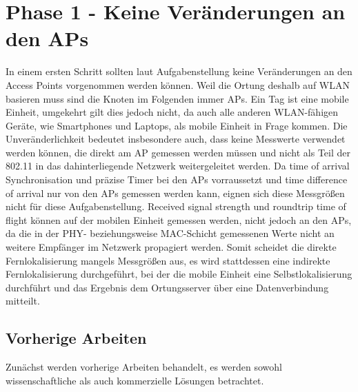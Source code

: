 \chapter{Phase 1 - Keine Veränderungen an den APs}
\label{ch:phase1}
In einem ersten Schritt sollten laut Aufgabenstellung keine Veränderungen an den Access Points vorgenommen werden können.
Weil die Ortung deshalb auf WLAN basieren muss sind die Knoten im Folgenden immer APs. 
Ein Tag ist eine mobile Einheit, umgekehrt gilt dies jedoch nicht, da auch alle anderen WLAN-fähigen Geräte, wie Smartphones und Laptops, als mobile Einheit in Frage kommen.
Die Unveränderlichkeit bedeutet insbesondere auch, dass keine Messwerte verwendet werden können, die direkt am AP gemessen werden müssen und nicht als Teil der 802.11 in das dahinterliegende Netzwerk weitergeleitet werden.
Da time of arrival Synchronisation und präzise Timer bei den APs vorraussetzt und time difference of arrival nur von den APs gemessen werden kann, eignen sich diese Messgrößen nicht für diese Aufgabenstellung.
Received signal strength und roundtrip time of flight können auf der mobilen Einheit gemessen werden, nicht jedoch an den APs, da die in der PHY- beziehungsweise MAC-Schicht gemessenen Werte nicht an weitere Empfänger im Netzwerk propagiert werden. 
Somit scheidet die direkte Fernlokalisierung mangels Messgrößen aus, es wird stattdessen eine indirekte Fernlokalisierung durchgeführt, bei der die mobile Einheit eine Selbstlokalisierung durchführt und das Ergebnis dem Ortungsserver über eine Datenverbindung mitteilt.


\section{Vorherige Arbeiten}
\label{ch:phase1:sec:vorherige}
Zunächst werden vorherige Arbeiten behandelt, es werden sowohl wissenschaftliche als auch kommerzielle Lösungen betrachtet.


